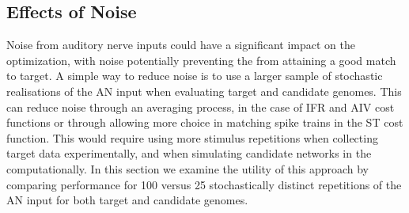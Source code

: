% 
% 
% 




\subsection{Effects of Noise}\label{sec:GA:effects-noise}

Noise from auditory nerve inputs could have a significant impact on
the {\GA} optimization, with noise potentially preventing the {\GA} from
attaining a good match to target. A simple way to reduce noise is to
use a larger sample of stochastic realisations of the AN input when
evaluating target and candidate genomes. This can reduce noise through
an averaging process, in the case of IFR and AIV cost functions or
through allowing more choice in matching spike trains in the ST cost
function. This would require using more stimulus repetitions when
collecting target data experimentally, and when simulating candidate
networks in the {\GA} computationally. In this section we examine the
utility of this approach by comparing {\GA} performance for 100 versus 25
stochastically distinct repetitions of the AN input for both target
and candidate genomes.

\smallskip{}


